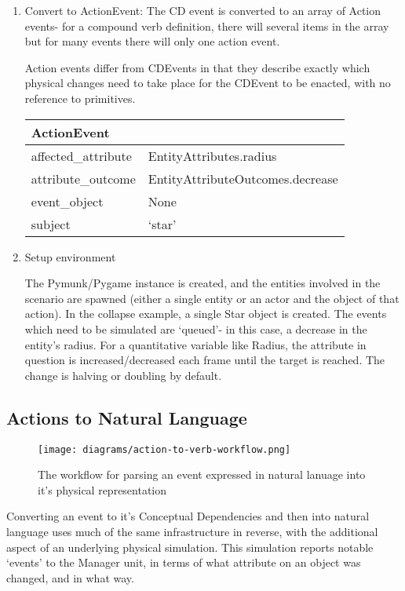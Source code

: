 \documentclass[dissertation.tex]{subfiles}
\begin{document}
\begin{enumerate}
    \item Convert to ActionEvent: The CD event is converted to an array of Action events- for a compound verb definition, there will several items in the array but for many events there will only one action event. 

    Action events differ from CDEvents in that they describe exactly which physical changes need to take place for the CDEvent to be enacted, with no reference to primitives.

    \begin{tabular}{l l}
        \toprule
        \textbf{ActionEvent}\\
        \midrule
        affected\_attribute & EntityAttributes.radius\\
        attribute\_outcome & EntityAttributeOutcomes.decrease\\
        event\_object & None\\
        subject & `star'\\
        \bottomrule
    \end{tabular}

    \item Setup environment

    The Pymunk/Pygame instance is created, and the entities involved in the scenario are spawned (either a single entity or an actor and the object of that action). In the collapse example, a single Star object is created. The events which need to be simulated are `queued'- in this case, a decrease in the entity's radius. For a quantitative variable like Radius, the attribute in question is increased/decreased each frame until the target is reached. The change is halving or doubling by default.
    \end{enumerate}


    \subsection{Actions to Natural Language}
    \begin{figure}[h]
        \begin{center}        
            \texttt{[image: diagrams/action-to-verb-workflow.png]}
        \end{center}
        \caption{The workflow for parsing an event expressed in natural lanuage into it's physical representation}
    \end{figure}

    Converting an event to it's Conceptual Dependencies and then into natural language uses much of the same infrastructure in reverse, with the additional aspect of an underlying physical simulation. This simulation reports notable `events' to the Manager unit, in terms of what attribute on an object was changed, and in what way.
\end{document}
